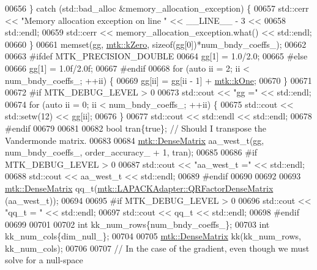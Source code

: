 \begin{DoxyCode}
{{00656   \} \textcolor{keywordflow}{catch} (std::bad\_alloc &memory\_allocation\_exception) \{
00657     std::cerr << \textcolor{stringliteral}{"Memory allocation exception on line "} << \_\_LINE\_\_ - 3 <<
00658       std::endl;
00659     std::cerr << memory\_allocation\_exception.what() << std::endl;
00660   \}
00661   memset(gg, \hyperlink{group__c01-roots_ga59a451a5fae30d59649bcda274fea271}{mtk::kZero}, \textcolor{keyword}{sizeof}(gg[0])*num\_bndy\_coeffs\_);
00662 
00663 \textcolor{preprocessor}{  #ifdef MTK\_PRECISION\_DOUBLE}
00664   gg[1] = 1.0/2.0;
00665 \textcolor{preprocessor}{  #else}
00666   gg[1] = 1.0f/2.0f;
00667 \textcolor{preprocessor}{  #endif}
00668   \textcolor{keywordflow}{for} (\textcolor{keyword}{auto} ii = 2; ii < num\_bndy\_coeffs\_; ++ii) \{
00669     gg[ii] = gg[ii - 1] + \hyperlink{group__c01-roots_ga26407c24d43b6b95480943340d285c71}{mtk::kOne};
00670   \}
00671 
00672 \textcolor{preprocessor}{  #if MTK\_DEBUG\_LEVEL > 0}
00673   std::cout << \textcolor{stringliteral}{"gg ="} << std::endl;
00674   \textcolor{keywordflow}{for} (\textcolor{keyword}{auto} ii = 0; ii < num\_bndy\_coeffs\_; ++ii) \{
00675     std::cout << std::setw(12) << gg[ii];
00676   \}
00677   std::cout << std::endl << std::endl;
00678 \textcolor{preprocessor}{  #endif}
00679 
00681 
00682   \textcolor{keywordtype}{bool} tran\{\textcolor{keyword}{true}\}; \textcolor{comment}{// Should I transpose the Vandermonde matrix.}
00683 
00684   \hyperlink{classmtk_1_1DenseMatrix}{mtk::DenseMatrix} aa\_west\_t(gg, num\_bndy\_coeffs\_, order\_accuracy\_ + 1, tran);
00685 
00686 \textcolor{preprocessor}{  #if MTK\_DEBUG\_LEVEL > 0}
00687   std::cout << \textcolor{stringliteral}{"aa\_west\_t ="} << std::endl;
00688   std::cout << aa\_west\_t << std::endl;
00689 \textcolor{preprocessor}{  #endif}
00690 
00692 
00693   \hyperlink{classmtk_1_1DenseMatrix}{mtk::DenseMatrix} qq\_t(\hyperlink{classmtk_1_1LAPACKAdapter_ae5c6e78c9c819c9ac7a6f31bfd011d7a}{mtk::LAPACKAdapter::QRFactorDenseMatrix}
      (aa\_west\_t));
00694 
00695 \textcolor{preprocessor}{  #if MTK\_DEBUG\_LEVEL > 0}
00696   std::cout << \textcolor{stringliteral}{"qq\_t = "} << std::endl;
00697   std::cout << qq\_t << std::endl;
00698 \textcolor{preprocessor}{  #endif}
00699 
00701 
00702   \textcolor{keywordtype}{int} kk\_num\_rows\{num\_bndy\_coeffs\_\};
00703   \textcolor{keywordtype}{int} kk\_num\_cols\{dim\_null\_\};
00704 
00705   \hyperlink{classmtk_1_1DenseMatrix}{mtk::DenseMatrix} kk(kk\_num\_rows, kk\_num\_cols);
00706 
00707   \textcolor{comment}{// In the case of the gradient, even though we must solve for a null-space}
}}
\end{DoxyCode}
